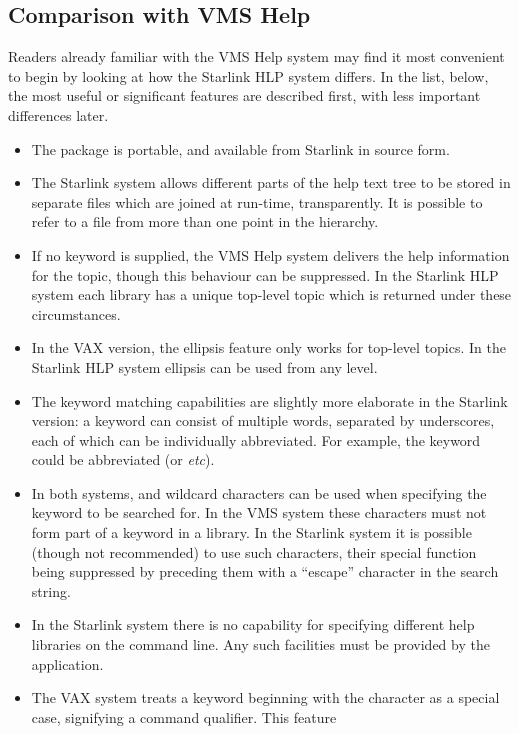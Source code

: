 \subsection{Comparison with VMS Help}
Readers already familiar with the VMS Help system may find it
most convenient to begin by looking at how the Starlink HLP
system differs.  In the
list, below, the most useful or significant features are
described first, with less important differences later.
\begin{itemize}
\item The package is portable, and available from Starlink in
source form.
\item The Starlink system allows different parts of the help text
tree to be stored in separate files which are joined
at run-time, transparently.  It is possible to refer to a file
from more than one point in the hierarchy.
\item If no keyword is supplied, the VMS Help system delivers
the help information for the  topic, though this
behaviour can be suppressed.  In the Starlink HLP
system each library has a unique top-level topic which is
returned under these circumstances.
\item In the VAX version, the  ellipsis feature
only works for top-level topics.  In the Starlink HLP system
ellipsis can be used from any level.
\item The keyword matching capabilities are slightly more
elaborate in the Starlink version: a keyword can consist
of multiple words, separated by
underscores, each of which can be individually abbreviated.
For example, the keyword  could
be abbreviated  (or  {\it etc}).  
\item In both systems, \fstring{\%} and \fstring{*}
wildcard characters can be used
when specifying the keyword to be searched for.  In the VMS system
these characters
must not form part of a keyword in a library.  In the Starlink
system it is possible (though not recommended) to use such
characters, their special function being
suppressed by preceding them with a \fstring{$\backslash$}
``escape'' character in the search string.
\item In the Starlink system there is no capability for specifying
different help libraries on the command line.  Any such facilities
must be provided by the application.
\item The VAX system treats a keyword beginning with the character
\fstring{/} as a special case, signifying a command qualifier.  This feature

\end{itemize}
